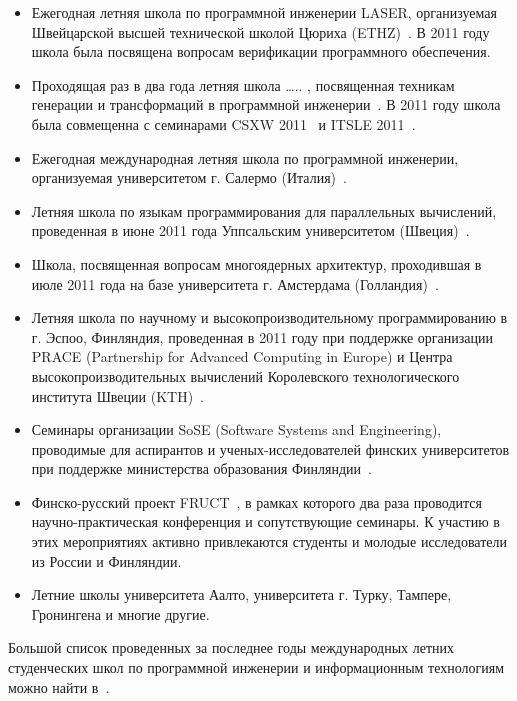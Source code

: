 \documentclass[a5paper]{article}
\begin{document}
\begin{itemize}
  \item Ежегодная летняя школа по программной инженерии LASER, организуемая Швейцарской высшей технической школой Цюриха (ETHZ)~\cite{school1}.  В 2011 году школа была посвящена вопросам верификации программного обеспечения.
  \item Проходящая раз в два года летняя школа ….. , посвященная техникам генерации и трансформаций в программной инженерии~\cite{school2}. В  2011 году школа была совмещенна с семинарами CSXW 2011~\cite{school3} и ITSLE 2011~\cite{school4}. 
  \item Ежегодная международная летняя школа по программной инженерии, организуемая университетом г. Салермо (Италия)~\cite{school5}.
  \item Летняя школа по языкам программирования для параллельных вычислений, проведенная в июне 2011 года Уппсальским университетом (Швеция)~\cite{school6}.
  \item Школа, посвященная вопросам многоядерных архитектур, проходившая в июле 2011 года на базе университета г. Амстердама (Голландия)~\cite{school7}.
  \item Летняя школа по научному и высокопроизводительному программированию в г. Эспоо, Финляндия, проведенная в 2011 году при поддержке организации PRACE (Partnership for Advanced Computing in Europe) и Центра высокопроизводительных вычислений Королевского технологического института Швеции (KTH)~\cite{school8}.
  \item Семинары организации SoSE (Software Systems and Engineering), проводимые для аспирантов и ученых-исследователей финских университетов при поддержке министерства образования Финляндии~\cite{school9}.
  \item Финско-русский проект FRUCT~\cite{school10}, в рамках которого  два раза проводится научно-практическая конференция и сопутствующие семинары. К участию в этих мероприятиях активно привлекаются студенты и молодые исследователи из России и Финляндии.  
  \item Летние школы университета Аалто, университета г. Турку, Тампере, Гронингена и многие другие.
\end{itemize}

Большой список проведенных за последнее годы международных летних студенческих школ по программной инженерии и информационным технологиям можно найти в~\cite{schoolList}. 
\end{document}
